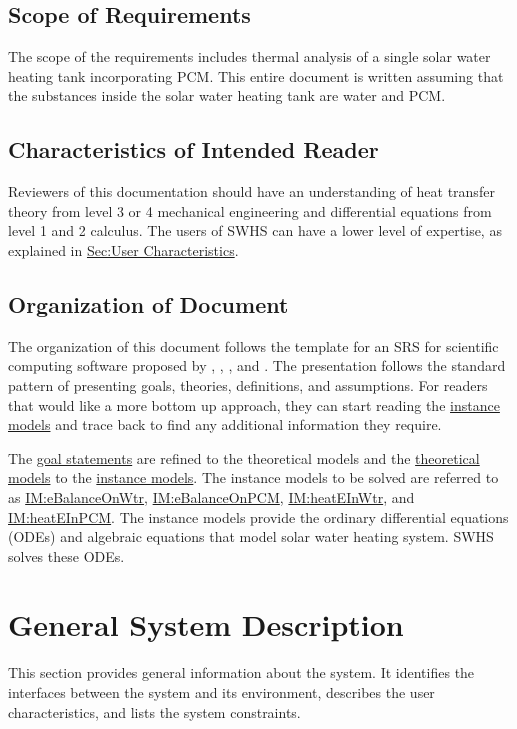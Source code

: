 \documentclass[12pt]{article}
\begin{document}
\subsection{Scope of Requirements}
\label{Sec:ReqsScope}
The scope of the requirements includes thermal analysis of a single solar water heating tank incorporating PCM. This entire document is written assuming that the substances inside the solar water heating tank are water and PCM.

\subsection{Characteristics of Intended Reader}
\label{Sec:ReaderChars}
Reviewers of this documentation should have an understanding of heat transfer theory from level 3 or 4 mechanical engineering and differential equations from level 1 and 2 calculus. The users of SWHS can have a lower level of expertise, as explained in \hyperref[Sec:UserChars]{Sec:User Characteristics}.

\subsection{Organization of Document}
\label{Sec:DocOrg}
The organization of this document follows the template for an SRS for scientific computing software proposed by \cite{koothoor2013}, \cite{smithLai2005}, \cite{smithEtAl2007}, and \cite{smithKoothoor2016}. The presentation follows the standard pattern of presenting goals, theories, definitions, and assumptions. For readers that would like a more bottom up approach, they can start reading the \hyperref[Sec:IMs]{instance models} and trace back to find any additional information they require.

The \hyperref[Sec:GoalStmt]{goal statements} are refined to the theoretical models and the \hyperref[Sec:TMs]{theoretical models} to the \hyperref[Sec:IMs]{instance models}. The instance models to be solved are referred to as \hyperref[IM:eBalanceOnWtr]{IM:eBalanceOnWtr}, \hyperref[IM:eBalanceOnPCM]{IM:eBalanceOnPCM}, \hyperref[IM:heatEInWtr]{IM:heatEInWtr}, and \hyperref[IM:heatEInPCM]{IM:heatEInPCM}. The instance models provide the ordinary differential equations (ODEs) and algebraic equations that model solar water heating system. SWHS solves these ODEs.

\section{General System Description}
\label{Sec:GenSysDesc}
This section provides general information about the system. It identifies the interfaces between the system and its environment, describes the user characteristics, and lists the system constraints.
\end{document}
